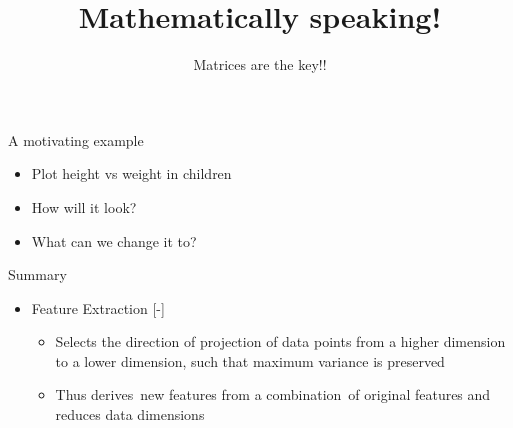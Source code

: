 \documentclass[aspectratio=169,14pt,usenames,dvipsnames]{beamer}
\begin{document}
\begin{frame}{A motivating example}
\begin{itemize}
\item Plot height vs weight in children
\item How will it look?
\item What can we change it to?
\end{itemize}
\end{frame}

\begin{frame}{Summary}
\begin{itemize}
\item Feature Extraction
[-]
\begin{itemize}
\item Selects the direction of projection of data points from a higher dimension to a lower dimension, such that maximum variance is preserved
\item Thus derives new features from a combination of original features and reduces data dimensions
\end{itemize}
\end{itemize}
\end{frame}

{\1
\begin{frame}
	\title{Mathematically speaking!}
	\subtitle{Matrices are the key!!}
\titlepage
\end{frame}
}
\end{document}
